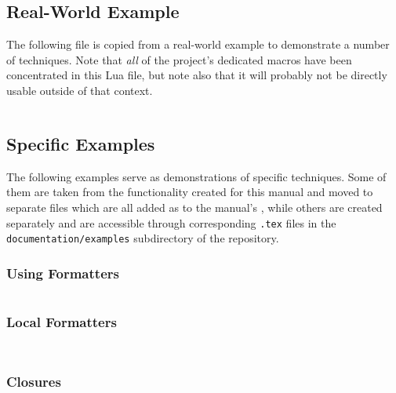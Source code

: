 \documentclass[12pt]{scrartcl}
\begin{document}
\inputminted[firstline=11]{lua}{luaformatters-manual-templates.lua}

\enlargethispage*{4\baselineskip}

\subsection{Real-World Example}
\label{sec:examples:real-world-example}

The following file is copied from a real-world example to demonstrate a number of techniques.  Note that \emph{all} of the project's dedicated macros have been concentrated in this Lua file, but note also that it will probably not be directly usable outside of that context.

\inputminted{lua}{examples/schubert-templates.lua}


\subsection{Specific Examples}
\label{sec:specific-examples}

The following examples serve as demonstrations of specific techniques.  Some of
them are taken from the functionality created for this manual and moved to
separate files which are all added as  to the manual's
, while others are created separately and are accessible
through corresponding \texttt{.tex} files in the \texttt{documentation/examples}
subdirectory of the repository.


\subsubsection{Using Formatters}
\label{sec:examples:using-formatters}

\inputminted{lua}{examples/format.lua}


\subsubsection{Local Formatters}
\label{sec:examples:local-formatters}

\inputminted{lua}{examples/local-formatters.lua}

\inputminted{tex}{examples/local-formatters.tex}


\subsubsection{Closures}
\label{sec:examples:closures}
\end{document}
